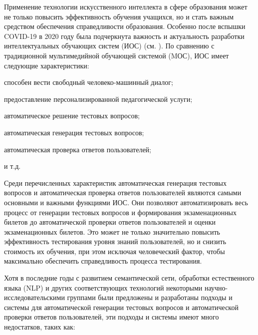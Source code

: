 Применение технологии искусственного интеллекта в сфере образования может не только повысить эффективность обучения учащихся, но и стать важным средством обеспечения справедливости образования. Особенно после вспышки COVID-19 в 2020 году была подчеркнута важность и актуальность разработки интеллектуальных обучающих систем (ИОС) (см. ). По сравнению с традиционной мультимедийной обучающей системой (MОС), ИОС имеет следующие характеристики:

\begin{textitemize}
	\item способен вести свободный человеко-машинный диалог;
	\item предоставление персонализированной педагогической услуги;
	\item автоматическое решение тестовых вопросов;
	\item автоматическая генерация тестовых вопросов;
	\item автоматическая проверка ответов пользователей;
	\item и т.д.
\end{textitemize}

Среди перечисленных характеристик автоматическая генерация тестовых вопросов и автоматическая проверка ответов пользователей являются самыми основными и важными функциями ИОС. Они позволяют автоматизировать весь процесс от генерации тестовых вопросов и формирования экзаменационных билетов до автоматической проверки ответов пользователей и оценки экзаменационных билетов. Это может не только значительно повысить эффективность тестирования уровня знаний пользователей, но и снизить стоимость их обучения, при этом исключая человеческий фактор, чтобы максимально обеспечить справедливость процесса тестирования.

Хотя в последние годы с развитием семантической сети, обработки естественного языка (NLP) и других соответствующих технологий некоторыми научно-исследовательскими группами были предложены и разработаны подходы и системы для автоматической генерации тестовых вопросов и автоматической проверки ответов пользователей, эти подходы и системы имеют много недостатков, таких как:

